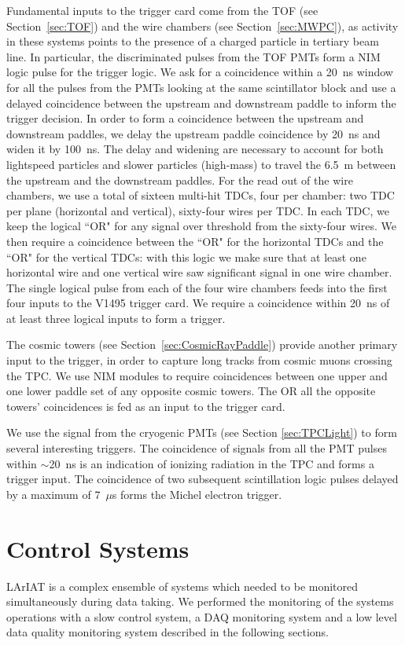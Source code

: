 Fundamental inputs to the trigger card come from the TOF (see Section~\ref{sec:TOF}) and the wire chambers (see Section~\ref{sec:MWPC}), as activity in these systems points to the presence of a charged particle in tertiary beam line.
In particular, the discriminated pulses from the TOF PMTs form a NIM logic pulse for the trigger logic. We ask for a coincidence within a 20~ns window for all the pulses from the PMTs looking at the same scintillator block and use a delayed coincidence between the upstream and downstream paddle to inform the trigger decision. In order to form a coincidence between the upstream and downstream paddles, we delay the upstream paddle coincidence by 20~ns and widen it by 100~ns. The delay and widening are necessary to account for both  lightspeed particles and slower particles (high-mass) to travel the 6.5~m between the upstream and the downstream paddles. 
For the read out of the wire chambers, we use a total of sixteen multi-hit TDCs\cite{Sten}, four per chamber: two TDC per plane (horizontal and vertical), sixty-four wires per TDC. In each TDC, we keep the logical ``OR" for any signal over threshold from the sixty-four wires. We then require a coincidence between the ``OR" for the horizontal TDCs and the ``OR" for the vertical TDCs: with this logic we make sure that at least one horizontal wire and one vertical wire saw significant signal in one wire chamber.  The single logical pulse from each of the four wire chambers feeds into the first four inputs to the V1495 trigger card. We require a coincidence within 20~ns of at least three logical inputs to form a trigger.


The cosmic towers (see Section~\ref{sec:CosmicRayPaddle}) provide another primary input to the trigger, in order to capture long tracks from cosmic muons crossing the TPC. We use NIM modules to require coincidences between one upper and one lower paddle set of any opposite cosmic towers. The OR all the opposite towers' coincidences is fed as an input to the trigger card. 

We use the signal from the cryogenic PMTs (see Section \ref{sec:TPCLight}) to form several interesting triggers. The coincidence of signals from all the PMT pulses within $\sim$20~ns is an indication of ionizing radiation in the TPC and forms a trigger input.  The coincidence of two subsequent scintillation logic pulses delayed by a maximum of  7~$\mu$s forms the Michel electron trigger. 




\section{Control Systems}
LArIAT is a complex ensemble of systems which needed to be monitored simultaneously during data taking.  We performed the monitoring of the systems operations with a slow control system, a DAQ monitoring system and a low level data quality monitoring system described in the following sections.

